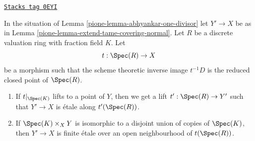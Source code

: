 \begin{lemma}
\label{pione-lemma-tame-covering-split}
\href{https://stacks.math.columbia.edu/tag/0EYI}{\texttt{Stacks tag 0EYI}}

In the situation of Lemma \ref{pione-lemma-abhyankar-one-divisor}
let $Y' \to X$ be as in Lemma \ref{pione-lemma-extend-tame-covering-normal}.
Let $R$ be a discrete valuation ring with fraction field $K$.
Let
$$
t : \Spec(R) \to X
$$
be a morphism such that the scheme theoretic inverse image
$t^{-1}D$ is the reduced closed point of $\Spec(R)$.
\begin{enumerate}
\item If $t|_{\Spec(K)}$ lifts to a point of $Y$, then
we get a lift $t' : \Spec(R) \to Y'$ such that $Y' \to X$
is \'etale along $t'(\Spec(R))$.
\item If $\Spec(K) \times_X Y$ is isomorphic to a disjoint union
of copies of $\Spec(K)$, then $Y' \to X$ is finite \'etale
over an open neighbourhood of $t(\Spec(R))$.
\end{enumerate}
\end{lemma}

